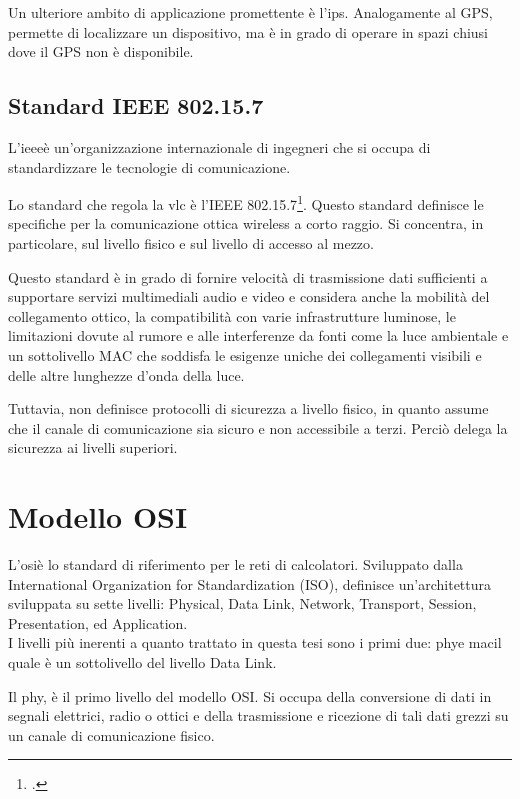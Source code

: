 Un ulteriore ambito di applicazione promettente è l'\gls{ips}\glsfirstoccur. Analogamente al GPS, permette di localizzare un dispositivo, ma è in grado di operare in spazi chiusi dove il GPS non è disponibile.

\subsection{Standard IEEE 802.15.7}
L'\gls{ieee}\glsfirstoccur è un'organizzazione internazionale di ingegneri che si occupa di standardizzare le tecnologie di comunicazione.

Lo standard che regola la \gls{vlc} è l'IEEE 802.15.7\footcite{ieee802157}. Questo standard definisce le specifiche per la comunicazione ottica wireless a corto raggio. Si concentra, in particolare, sul livello fisico e sul livello di accesso al mezzo.

Questo standard è in grado di fornire velocità di trasmissione dati sufficienti a supportare servizi multimediali audio e video e considera anche la mobilità del collegamento ottico, la compatibilità con varie infrastrutture luminose, le limitazioni dovute al rumore e alle interferenze da fonti come la luce ambientale e un sottolivello MAC che soddisfa le esigenze uniche dei collegamenti visibili e delle altre lunghezze d'onda della luce.

Tuttavia, non definisce protocolli di sicurezza a livello fisico, in quanto assume che il canale di comunicazione sia sicuro e non accessibile a terzi. Perciò delega la sicurezza ai livelli superiori.

\section{Modello OSI}

L'\gls{osi}\glsfirstoccur è lo standard di riferimento per le reti di calcolatori. Sviluppato dalla International Organization for Standardization (ISO), definisce un'architettura sviluppata su sette livelli: Physical, Data Link, Network, Transport, Session, Presentation, ed Application.\\
I livelli più inerenti a quanto trattato in questa tesi sono i primi due: \gls{phy}\glsfirstoccur e \gls{mac}\glsfirstoccur il quale è un sottolivello del livello Data Link.

Il \gls{phy}, è il primo livello del modello OSI. Si occupa della conversione di dati in segnali elettrici, radio o ottici e della trasmissione e ricezione di tali dati grezzi su un canale di comunicazione fisico.

